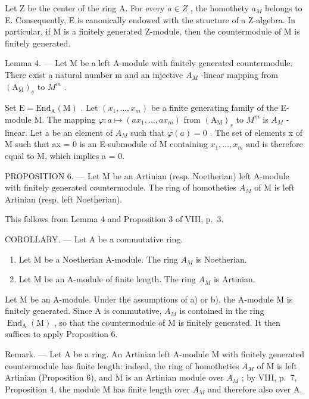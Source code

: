 Let Z be the center of the ring A. For every \(a \in Z\) , the homothety \(a_{M}\) belongs to E. Consequently, E is canonically endowed with the structure of a Z-algebra. In particular, if M is a finitely generated Z-module, then the countermodule of M is finitely generated.

Lemma 4. --- Let M be a left A-module with finitely generated countermodule. There exist a natural number m and an injective \(A_{M}\) -linear mapping from \((\mathrm{A}_{\mathrm{M}})_{s}\) to \(M^{m}\) .

Set \(\mathrm{E}=\mathrm{End}_{\mathrm{A}}(\mathrm{M})\) . Let \((x_{1},\ldots,x_{m})\) be a finite generating family of the E-module M. The mapping \(\varphi:a\mapsto(ax_{1},\ldots,ax_{m})\) from \((\mathrm{A}_{\mathrm{M}})_{s}\) to \(M^{m}\) is \(A_{M}\) -linear. Let a be an element of \(A_{M}\) such that \(\varphi(a)=0\) . The set of elements x of M such that ax = 0 is an E-submodule of M containing \(x_{1}, \ldots, x_{m}\) and is therefore equal to M, which implies a = 0.

PROPOSITION 6. --- Let M be an Artinian (resp. Noetherian) left A-module with finitely generated countermodule. The ring of homotheties \(A_{M}\) of M is left Artinian (resp. left Noetherian).

This follows from Lemma 4 and Proposition 3 of VIII, p.~3.

COROLLARY. --- Let A be a commutative ring.

\begin{enumerate}
\def\labelenumi{\alph{enumi})}
\item
  Let M be a Noetherian A-module. The ring \(A_{M}\) is Noetherian.
\item
  Let M be an A-module of finite length. The ring \(A_{M}\) is Artinian.
\end{enumerate}

Let M be an A-module. Under the assumptions of a) or b), the A-module M is finitely generated. Since A is commutative, \(A_{M}\) is contained in the ring \(\operatorname{End}_{\mathrm{A}}(\mathrm{M})\) , so that the countermodule of M is finitely generated. It then suffices to apply Proposition 6.

Remark. --- Let A be a ring. An Artinian left A-module M with finitely generated countermodule has finite length: indeed, the ring of homotheties \(A_{M}\) of M is left Artinian (Proposition 6), and M is an Artinian module over \(A_{M}\) ; by VIII, p.~7, Proposition 4, the module M has finite length over \(A_{M}\) and therefore also over A.

